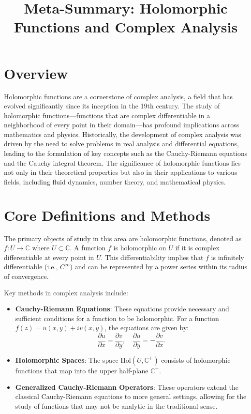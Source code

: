 \documentclass[11pt,a4paper]{article}
\title{Meta-Summary: Holomorphic Functions and Complex Analysis}
\date{}
\begin{document}
\maketitle

\section{Overview}
Holomorphic functions are a cornerstone of complex analysis, a field that has evolved significantly since its inception in the 19th century. The study of holomorphic functions---functions that are complex differentiable in a neighborhood of every point in their domain---has profound implications across mathematics and physics. Historically, the development of complex analysis was driven by the need to solve problems in real analysis and differential equations, leading to the formulation of key concepts such as the Cauchy-Riemann equations and the Cauchy integral theorem. The significance of holomorphic functions lies not only in their theoretical properties but also in their applications to various fields, including fluid dynamics, number theory, and mathematical physics.

\section{Core Definitions and Methods}
The primary objects of study in this area are holomorphic functions, denoted as \( f: U \to \mathbb{C} \) where \( U \subset \mathbb{C} \). A function \( f \) is holomorphic on \( U \) if it is complex differentiable at every point in \( U \). This differentiability implies that \( f \) is infinitely differentiable (i.e., \( C^\infty \)) and can be represented by a power series within its radius of convergence.

Key methods in complex analysis include:
\begin{itemize}
\item \textbf{Cauchy-Riemann Equations}: These equations provide necessary and sufficient conditions for a function to be holomorphic. For a function \( f(z) = u(x, y) + iv(x, y) \), the equations are given by:
\[
\frac{\partial u}{\partial x} = \frac{\partial v}{\partial y}, \quad \frac{\partial u}{\partial y} = -\frac{\partial v}{\partial x}.
\]
\item \textbf{Holomorphic Spaces}: The space \( \text{Hol}(U, \mathbb{C}^+) \) consists of holomorphic functions that map into the upper half-plane \( \mathbb{C}^+ \).
\item \textbf{Generalized Cauchy-Riemann Operators}: These operators extend the classical Cauchy-Riemann equations to more general settings, allowing for the study of functions that may not be analytic in the traditional sense.
\end{itemize}
\end{document}
